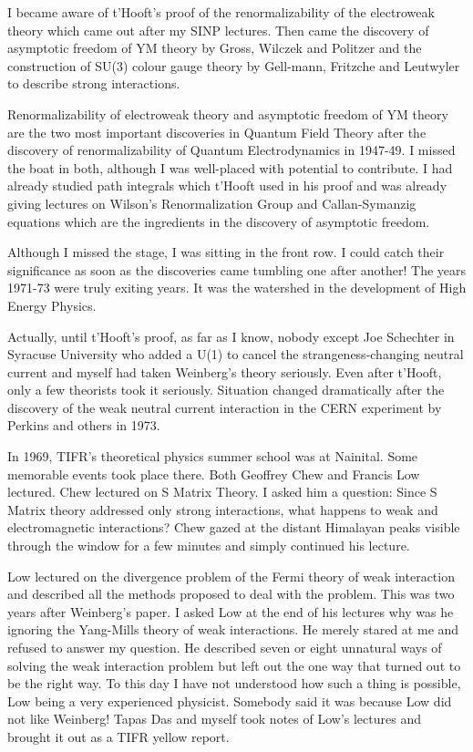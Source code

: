 I became aware of t'Hooft's proof of the renormalizability of the 
electroweak theory which came out after my SINP lectures. Then came the 
discovery of asymptotic freedom of YM theory by Gross, Wilczek and 
Politzer and the construction of SU(3) colour gauge theory by Gell-mann, 
Fritzche and Leutwyler to describe strong interactions.

Renormalizability of electroweak theory and asymptotic freedom of YM 
theory are the two most important discoveries in Quantum Field Theory 
after the discovery of renormalizability of Quantum Electrodynamics in 
1947-49. I missed the boat in both, although I was well-placed with 
potential to contribute. I had already studied path integrals which 
t'Hooft used in his proof and was already giving lectures on Wilson's 
Renormalization Group and Callan-Symanzig equations which are the 
ingredients in the discovery of asymptotic freedom.

Although I missed the stage, I was sitting in the front row. I could 
catch their significance as soon as the discoveries came tumbling one 
after another! The years 1971-73 were truly exiting years. It was the 
watershed in the development of High Energy Physics.
  
Actually, until t'Hooft's proof, as far as I know, nobody except Joe 
Schechter in Syracuse University who added a U(1) to cancel the 
strangeness-changing neutral current and myself had taken Weinberg's 
theory seriously. Even after t'Hooft, only a few theorists took it 
seriously. Situation changed dramatically after the discovery of the 
weak neutral current interaction in the CERN experiment by Perkins and 
others in 1973.

In 1969, TIFR's theoretical physics summer school was at Nainital. Some 
memorable events took place there. Both Geoffrey Chew and Francis Low 
lectured. Chew lectured on S Matrix Theory. I asked him a question: 
Since S Matrix theory addressed only strong interactions, what happens 
to weak and electromagnetic interactions? Chew gazed at the distant 
Himalayan peaks visible through the window for a few minutes and simply 
continued his lecture.

Low lectured on the divergence problem of the Fermi theory of weak 
interaction and described all the methods proposed to deal with the 
problem. This was two years after Weinberg's paper. I asked Low at the 
end of his lectures why was he ignoring the Yang-Mills theory of weak 
interactions. He merely stared at me and refused to answer my question. 
He described seven or eight unnatural ways of solving the weak 
interaction problem but left out the one way that turned out to be the 
right way. To this day I have not understood how such a thing is 
possible, Low being a very experienced physicist. Somebody said it was 
because Low did not like Weinberg! Tapas Das and myself took notes of 
Low's lectures and brought it out as a TIFR yellow report.


